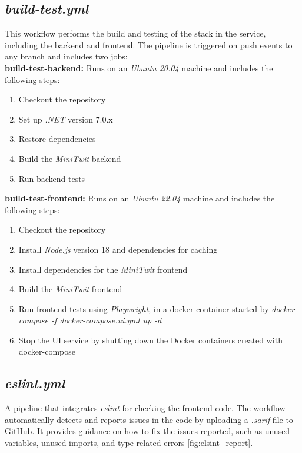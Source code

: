 \subsection{\textit{build-test.yml}}

This workflow performs the build and testing of the stack in the service, including the backend and frontend. The pipeline is triggered on push events to any branch and includes two jobs: \\

\textbf{build-test-backend:} Runs on an \textit{Ubuntu 20.04} machine and includes the following steps:

\begin{enumerate}
    \item Checkout the repository
    \item Set up \textit{.NET} version 7.0.x
    \item Restore dependencies
    \item Build the \textit{MiniTwit} backend
    \item Run backend tests
\end{enumerate}

\textbf{build-test-frontend:} Runs on an \textit{Ubuntu 22.04} machine and includes the following steps:

\begin{enumerate}
    \item Checkout the repository
    \item Install \textit{Node.js} version 18 and dependencies for caching
    \item Install dependencies for the \textit{MiniTwit} frontend
    \item Build the \textit{MiniTwit} frontend
    \item Run frontend tests using \textit{Playwright}, in a docker container started by \textit{docker-compose -f docker-compose.ui.yml up -d}
    \item Stop the UI service by shutting down the Docker containers created with docker-compose
\end{enumerate}

\subsection{\textit{eslint.yml}}

A pipeline that integrates \textit{eslint} for checking the frontend code. The workflow automatically detects and reports issues in the code by uploading a \textit{.sarif} file to GitHub. It provides guidance on how to fix the issues reported, such as unused variables, unused imports, and type-related errors \ref{fig:elsint_report}. 

